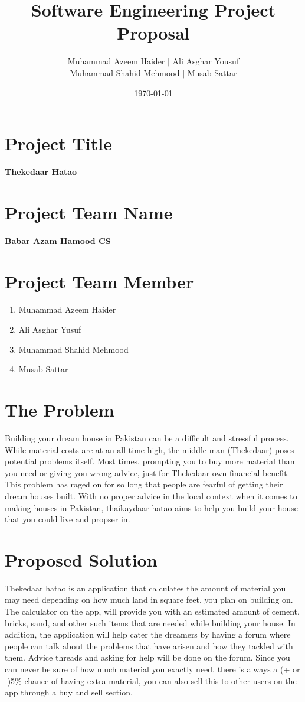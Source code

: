 \documentclass{article}
\title{Software Engineering Project Proposal}
\author{Muhammad Azeem Haider $\mid$ Ali Asghar Yousuf \\
        Muhammad Shahid Mehmood $\mid$ Musab Sattar}
\date{\today}
\begin{document}
\maketitle

\section*{Project Title}

\textbf{Thekedaar Hatao}

\section*{Project Team Name}

\textbf{Babar Azam Hamood CS}

\section*{Project Team Member}

\begin{enumerate}
    \item Muhammad Azeem Haider
    \item Ali Asghar Yusuf
    \item Muhammad Shahid Mehmood
    \item Musab Sattar
\end{enumerate}

\section*{The Problem}

Building your dream house in Pakistan can be a difficult and stressful process. While material costs are at an all time high, the middle man (Thekedaar) poses
potential problems itself. Most times, prompting you to buy more material than you need or giving you wrong advice, just for Thekedaar own financial benefit.
This problem has raged on for so long that people are fearful of getting their dream houses built. With no proper advice in the local context when it comes to
making houses in Pakistan, thaikaydaar hatao aims to help you build your house that you could live and propser in. 

\section*{Proposed Solution}

Thekedaar hatao is an application that calculates the amount of material you may need depending on how much land in square feet, you plan on building on.
The calculator on the app, will provide you with an estimated amount of cement, bricks, sand, and other such items that are needed while building your house.
In addition, the application will help cater the dreamers by having a forum where people can talk about the problems that have arisen and how they tackled with them.
Advice threads and asking for help will be done on the forum. Since you can never be sure of how much material you exactly need, there is always a (+ or -)5\%
chance of having extra material, you can also sell this to other users on the app through a buy and sell section.
\end{document}
